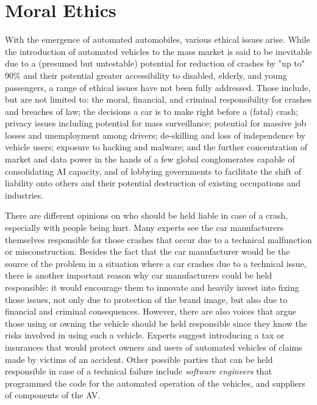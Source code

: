 \section{Moral Ethics}

With the emergence of automated automobiles, various ethical issues arise. While
the introduction of automated vehicles to the mass market is said to be
inevitable due to a (presumed but untestable) potential for reduction of crashes
by "up to" 90\% \cite{wiki1} and their potential greater accessibility to
disabled, elderly, and young passengers, a range of ethical issues have not been
fully addressed. Those include, but are not limited to: the moral, financial,
and criminal responsibility for crashes and breaches of law; the decisions a car
is to make right before a (fatal) crash; privacy issues including potential for
mass surveillance; potential for massive job losses and unemployment among
drivers; de-skilling and loss of independence by vehicle users; exposure to
hacking and malware; and the further concentration of market and data power in
the hands of a few global conglomerates capable of consolidating AI capacity,
and of lobbying governments to facilitate the shift of liability onto others and
their potential destruction of existing occupations and industries.

There are different opinions on who should be held liable in case of a crash,
especially with people being hurt. Many experts see the car manufacturers
themselves responsible for those crashes that occur due to a technical
malfunction or misconstruction. \cite{wiki2} Besides the fact that the car
manufacturer would be the source of the problem in a situation where a car
crashes due to a technical issue, there is another important reason why car
manufacturers could be held responsible: it would encourage them to innovate and
heavily invest into fixing those issues, not only due to protection of the brand
image, but also due to financial and criminal consequences. However, there are
also voices that argue those using or owning the
vehicle should be held responsible since they know the risks involved in using
such a vehicle. Experts  suggest introducing a tax or
insurances that would protect owners and users of automated vehicles of claims
made by victims of an accident. \cite{wiki2} Other possible parties that can
be held responsible in case of a technical failure include \emph{software
engineers} that programmed the code for the automated operation of the
vehicles, and suppliers of components of the AV. \cite{wiki3}

